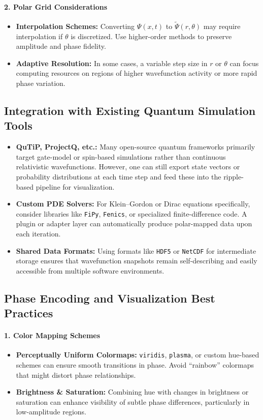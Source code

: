 \paragraph{2. Polar Grid Considerations}
\begin{itemize}
    \item \textbf{Interpolation Schemes:} Converting \(\Psi(x,t)\) to \(\tilde{\Psi}(r,\theta)\) may require interpolation if \(\theta\) is discretized. Use higher-order methods to preserve amplitude and phase fidelity.
    \item \textbf{Adaptive Resolution:} In some cases, a variable step size in \(r\) or \(\theta\) can focus computing resources on regions of higher wavefunction activity or more rapid phase variation.
\end{itemize}

\subsection{Integration with Existing Quantum Simulation Tools}
\begin{itemize}
    \item \textbf{QuTiP, ProjectQ, etc.:}
    Many open-source quantum frameworks primarily target gate-model or spin-based simulations rather than continuous relativistic wavefunctions. However, one can still export state vectors or probability distributions at each time step and feed these into the ripple-based pipeline for visualization.
    \item \textbf{Custom PDE Solvers:}
    For Klein--Gordon or Dirac equations specifically, consider libraries like \texttt{FiPy}, \texttt{Fenics}, or specialized finite-difference code. A plugin or adapter layer can automatically produce polar-mapped data upon each iteration.
    \item \textbf{Shared Data Formats:}
    Using formats like \texttt{HDF5} or \texttt{NetCDF} for intermediate storage ensures that wavefunction snapshots remain self-describing and easily accessible from multiple software environments.
\end{itemize}

\subsection{Phase Encoding and Visualization Best Practices}

\paragraph{1. Color Mapping Schemes}
\begin{itemize}
    \item \textbf{Perceptually Uniform Colormaps:} \texttt{viridis}, \texttt{plasma}, or custom hue-based schemes can ensure smooth transitions in phase. Avoid “rainbow” colormaps that might distort phase relationships.
    \item \textbf{Brightness \& Saturation:} Combining hue with changes in brightness or saturation can enhance visibility of subtle phase differences, particularly in low-amplitude regions.
\end{itemize}

